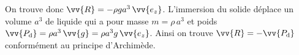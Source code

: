 
\begin{corrige}
On trouve donc $\vv{R}=-\rho g a^3\,\vv{e_z}$. L'immersion du solide déplace un volume $a^3$ de liquide qui a pour masse $m=\rho\,a^3$ et poids $\vv{P_\text{d}}=\rho a^3\,\vv{g}=\rho a^3g\,\vv{e_z}$. Ainsi on trouve $\vv{R}=-\vv{P_\text{d}}$ conformément au principe d'Archimède.
\end{corrige}


\finEntrainement




\hauteurLargeurCadreReponse		{7mm}{4cm}
\initialisationEntrainement

                                \initialisationPartieGauche %

